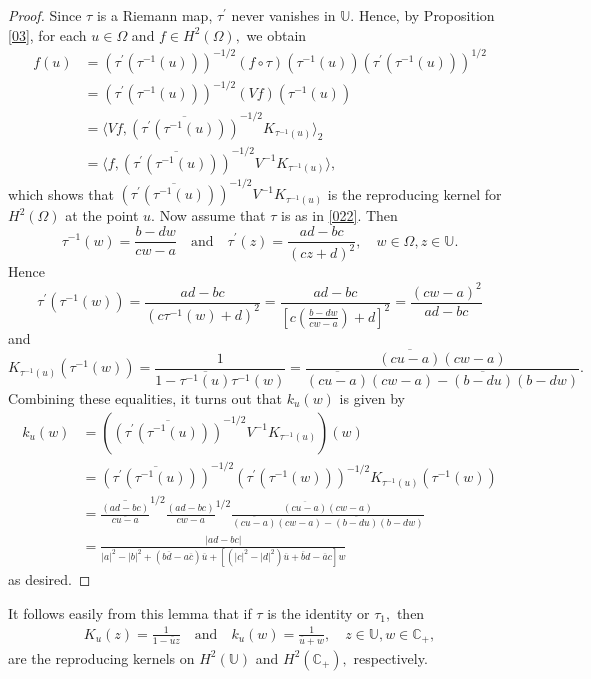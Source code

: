 \documentclass[11pt]{amsart}%
\theoremstyle{definition}
\theoremstyle{remark}
\numberwithin{equation}{section}
\begin{document}
\begin{proof}
Since $\tau$ is a Riemann map, $\tau^{\prime}$ never vanishes in $\mathbb{U}.$
Hence, by Proposition \ref{03}, for each $u\in\Omega$ and $f\in H^{2}%
(\Omega),$ we obtain
\begin{align*}
f(u) &  =(\tau^{\prime}(\tau^{-1}(u)))^{-1/2}(f\circ\tau)(\tau^{-1}%
(u))(\tau^{\prime}(\tau^{-1}(u)))^{1/2}\\
&  =(\tau^{\prime}(\tau^{-1}(u)))^{-1/2}(Vf)(\tau^{-1}(u))\\
&  =\langle Vf,\overline{(\tau^{\prime}(\tau^{-1}(u)))}^{-1/2}K_{\tau^{-1}%
(u)}\rangle_2\\
&  =\langle f,\overline{(\tau^{\prime}(\tau^{-1}(u)))}^{-1/2}V^{-1}%
K_{\tau^{-1}(u)}\rangle,
\end{align*}
which shows that $\overline{(\tau^{\prime}(\tau^{-1}(u)))}^{-1/2}V^{-1}%
K_{\tau^{-1}(u)}$ is the reproducing kernel for $H^{2}(\Omega)$ at the point
$u.$ Now assume that $\tau$ is as in \eqref{022}. Then
\[
\tau^{-1}(w)=\frac{b-dw}{cw-a}\quad\text{and}\quad\tau^{\prime}(z)=\frac
{ad-bc}{(cz+d)^{2}},\quad w\in\Omega,z\in\mathbb{U}.
\]
Hence
\[
\tau^{\prime}(\tau^{-1}(w))=\frac{ad-bc}{(c\tau^{-1}(w)+d)^{2}}=\frac
{ad-bc}{\left[  c\left(  \frac{b-dw}{cw-a}\right)  +d\right]  ^{2}}%
=\frac{(cw-a)^{2}}{ad-bc}%
\]
and
\[
K_{\tau^{-1}(u)}(\tau^{-1}(w))=\frac{1}{1-\overline{\tau^{-1}(u)}\tau^{-1}%
(w)}=\frac{\overline{(cu-a)}(cw-a)}{\overline{(cu-a)}(cw-a)-\overline
{(b-du)}(b-dw)}.
\]
Combining these equalities, it turns out that $k_{u}(w)$ is given by
\begin{align*}
k_{u}(w) &  =\left(  \overline
{(\tau^{\prime}(\tau^{-1}(u)))}^{-1/2}V^{-1}K_{\tau^{-1}(u)}\right)  (w)\\
&=\overline{(\tau^{\prime}(\tau^{-1}(u)))}^{-1/2}(\tau^{\prime
}(\tau^{-1}(w)))^{-1/2}K_{\tau^{-1}(u)}(\tau^{-1}(w))\\
&  =\overline{\frac{(ad-bc)}{\overline{cu-a}}}^{1/2}\frac{(ad-bc)}{cw-a}%
^{1/2}\frac{\overline{(cu-a)}(cw-a)}{\overline{(cu-a)}(cw-a)-\overline
{(b-du)}(b-dw)}\\
&  =\frac{|ad-bc|}{|a|^{2}-|b|^{2}+(b\overline{d}-a\overline{c})\overline
{u}+[(|c|^{2}-|d|^{2})\overline{u}+\overline{b}d-\overline{a}c]w}%
\end{align*}
as desired.
\end{proof}

It follows easily from this lemma that if $\tau$ is the identity or $\tau
_{1},$ then
\begin{align*}
K_{u}(z)=\frac{1}{1-\overline{u}z} \quad\text{and}\quad k_{u}(w)=\frac
{1}{\overline{u}+w}, \quad z\in\mathbb{U}, w\in\mathbb{C}_{+},
\end{align*}
are the reproducing kernels on $H^{2}(\mathbb{U})$ and $H^{2}(\mathbb{C}%
_{+}),$ respectively.
\end{document}
